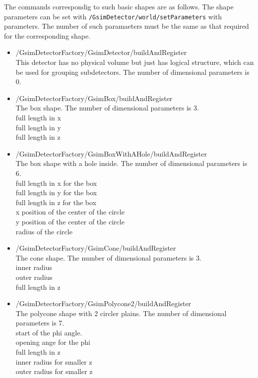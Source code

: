\documentclass[a4paper,12pt]{article}
\begin{document}
  The commands correspondig to such basic shapes are as follows.
  The shape parameters can be set with
  {\tt /GsimDetector/world/setParameters} with parameters.
  The number of such paramaeters must be the same as that required for
  the corresponding shape.
 \begin{itemize}
  \item /GsimDetectorFactory/GsimDetector/buildAndRegister\\
	This detector has no physical volume but just has logical
	structure, which can be used for grouping subdetectors.
	The number of dimensional parameters is 0.
  \item /GsimDetectorFactory/GsimBox/buildAndRegister\\
	The box shape.
	The number of dimensional parameters is 3.\\
	full length in x\\
	full length in y\\
	full length in z
  \item /GsimDetectorFactory/GsimBoxWithAHole/buildAndRegister\\
	The box shape with a hole inside.
	The number of dimensional parameters is 6.\\
	full length in x for the box\\
	full length in y for the box\\
	full length in z for the box\\
	x position of the center of the circle\\
	y position of the center of the circle\\
	radius of the circle
  \item /GsimDetectorFactory/GsimCone/buildAndRegister\\
	The cone shape.
	The number of dimensional parameters is 3.\\
	inner radius\\
	outer radius\\
	full length in z
  \item /GsimDetectorFactory/GsimPolycone2/buildAndRegister\\
	The polycone shape with 2 circler plains.
	The number of dimensional parameters is 7.\\
	start of the phi angle.\\
	opening ange for the phi\\
	full length in z\\
	inner radius for smaller z\\
	outer radius for smaller z\\

\end{itemize}
\end{document}
